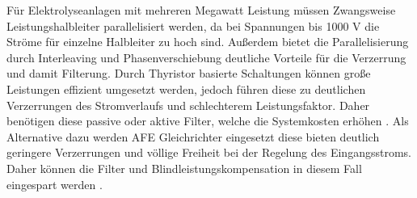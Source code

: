 		Für Elektrolyseanlagen mit mehreren Megawatt Leistung müssen Zwangsweise Leistungshalbleiter parallelisiert werden, da bei Spannungen bis 1000 V die Ströme für einzelne Halbleiter zu hoch sind. Außerdem bietet die Parallelisierung durch Interleaving und Phasenverschiebung deutliche Vorteile für die Verzerrung und damit Filterung. Durch Thyristor basierte Schaltungen können große Leistungen effizient umgesetzt werden, jedoch führen diese zu deutlichen Verzerrungen des Stromverlaufs und schlechterem Leistungsfaktor. Daher benötigen diese passive oder aktive Filter, welche die Systemkosten erhöhen \cite{HydrogenElectronicTopologies}.
		Als Alternative dazu werden \gls{AFE} Gleichrichter eingesetzt diese bieten deutlich geringere Verzerrungen und völlige Freiheit bei der Regelung des Eingangsstroms. Daher können die Filter und Blindleistungskompensation in diesem Fall eingespart werden \cite{HydrogenElectronicTopologies}.
		
